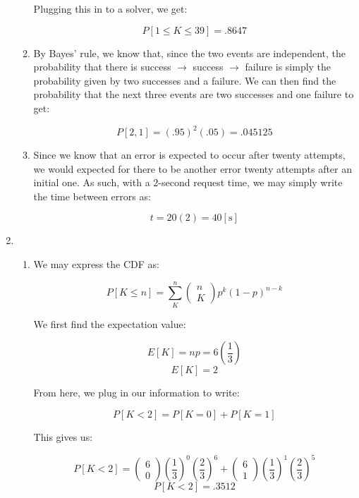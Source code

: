 \begin{enumerate}
\begin{enumerate}
        Plugging this in to a solver, we get:

        $$\boxed{P[1\leq K\leq 39]=.8647}$$

      \item By Bayes' rule, we know that, since the two events are independent, the probability that there is success $\to$ success $\to$ failure is simply the probability given by two successes and a failure. We can then find the probability that the next three events are two successes and one failure to get:

        $$\boxed{P[2,1]=(.95)^2(.05)=.045125}$$

      \item Since we know that an error is expected to occur after twenty attempts, we would expected for there to be another error twenty attempts after an initial one. As such, with a 2-second request time, we may simply write the time between errors as:

        $$\boxed{t=20(2)=40[\si{\second}]}$$

    \end{enumerate}

  \item 

    \begin{enumerate}

      \item We may express the CDF as:

        $$P[K\leq n]=\sum_{K}^n \left( \begin{matrix} n\\K\end{matrix} \right)p^k(1-p)^{n-k}$$

        We first find the expectation value:

        $$E[K]=np=6\left( \frac{1}{3} \right)$$
        $$\boxed{E[K]=2}$$

        From here, we plug in our information to write:

        $$P[K<2]=P[K=0]+P[K=1]$$

        This gives us:

        $$P[K< 2]=\left( \begin{matrix}6\\0\end{matrix} \right)\left( \frac{1}{3} \right)^0\left( \frac{2}{3} \right)^{6}+\left( \begin{matrix}6\\1\end{matrix} \right)\left( \frac{1}{3} \right)^1\left( \frac{2}{3} \right)^{5}$$
        $$P[K< 2]=.3512$$


\end{enumerate}
\end{enumerate}
